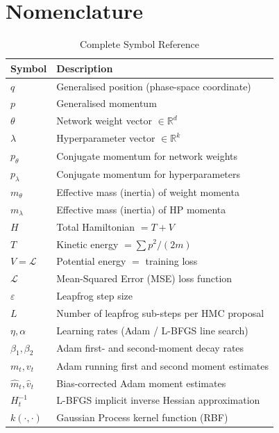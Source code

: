 \documentclass[11pt]{article}
\begin{document}
\section{Nomenclature}

\begin{table}[H]
\centering
\caption{Complete Symbol Reference}
\label{tab:nomenclature}
\renewcommand{\arraystretch}{1.35}
\begin{tabular}{>{\bfseries}p{1.45cm} p{6.0cm}}
\toprule
Symbol & Description \\
\midrule
$q$              & Generalised position (phase-space coordinate) \\
$p$              & Generalised momentum \\
$\theta$         & Network weight vector $\in\mathbb{R}^d$ \\
$\lambda$        & Hyperparameter vector $\in\mathbb{R}^k$ \\
$p_\theta$       & Conjugate momentum for network weights \\
$p_\lambda$      & Conjugate momentum for hyperparameters \\
$m_\theta$       & Effective mass (inertia) of weight momenta \\
$m_\lambda$      & Effective mass (inertia) of HP momenta \\
$H$              & Total Hamiltonian $= T + V$ \\
$T$              & Kinetic energy $= \sum p^2 / (2m)$ \\
$V = \mathcal{L}$& Potential energy $=$ training loss \\
$\mathcal{L}$    & Mean-Squared Error (MSE) loss function \\
$\varepsilon$    & Leapfrog step size \\
$L$              & Number of leapfrog sub-steps per HMC proposal \\
$\eta,\alpha$    & Learning rates (Adam / L-BFGS line search) \\
$\beta_1,\beta_2$& Adam first- and second-moment decay rates \\
$m_t, v_t$       & Adam running first and second moment estimates \\
$\hat{m}_t,\hat{v}_t$ & Bias-corrected Adam moment estimates \\
$H_t^{-1}$      & L-BFGS implicit inverse Hessian approximation \\
$k(\cdot,\cdot)$ & Gaussian Process kernel function (RBF) \\

\end{tabular}
\end{table}
\end{document}
